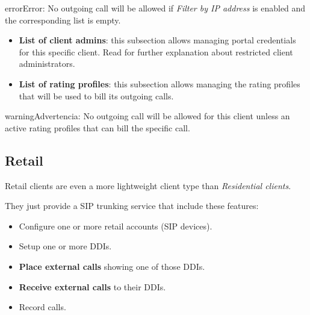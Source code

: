 \documentclass[letterpaper,10pt,spanish]{sphinxmanual}
\begin{document}
\begin{notice}{error}{Error:}
No outgoing call will be allowed if \emph{Filter by IP address} is enabled and the corresponding list is empty.
\end{notice}
\begin{itemize}
\item {} 
\textbf{List of client admins}: this subsection allows managing portal credentials for this specific client. Read {\hyperref[api_rest/acls:acls]{}}
for further explanation about restricted client administrators.

\item {} 
\textbf{List of rating profiles}: this subsection allows managing the rating profiles that will be used to bill its outgoing calls.

\end{itemize}

\begin{notice}{warning}{Advertencia:}
No outgoing call will be allowed for this client unless an active rating profiles that can
bill the specific call.
\end{notice}


\subsection{Retail}
\label{administration_portal/brand/clients/retail:retail-clients}\label{administration_portal/brand/clients/retail:retail}\label{administration_portal/brand/clients/retail::doc}
Retail clients are even a more lightweight client type than \emph{Residential clients}.

They just provide a SIP trunking service that include these features:
\begin{itemize}
\item {} 
Configure one or more retail accounts (SIP devices).

\item {} 
Setup one or more DDIs.

\item {} 
\textbf{Place external calls} showing one of those DDIs.

\item {} 
\textbf{Receive external calls} to their DDIs.

\item {} 
Record calls.

\end{itemize}
\end{document}
